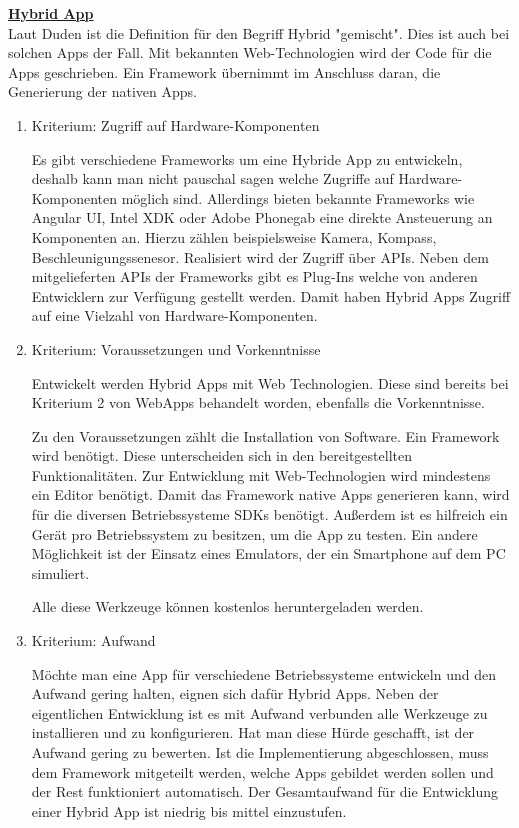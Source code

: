 \textbf{\underline{Hybrid App}}\\
Laut Duden ist die Definition für den Begriff Hybrid "gemischt". Dies ist auch bei solchen Apps der Fall. Mit bekannten Web-Technologien wird der Code für die Apps geschrieben. Ein Framework übernimmt im Anschluss daran, die Generierung der nativen Apps.  
\begin{enumerate}
\item Kriterium: Zugriff auf Hardware-Komponenten

Es gibt verschiedene Frameworks um eine Hybride App zu entwickeln, deshalb kann man nicht pauschal sagen welche Zugriffe auf Hardware-Komponenten möglich sind. Allerdings bieten bekannte Frameworks wie Angular UI, Intel XDK oder Adobe Phonegab eine direkte Ansteuerung an Komponenten an. Hierzu zählen beispielsweise Kamera, Kompass, Beschleunigungssenesor. Realisiert wird der Zugriff über APIs. Neben dem mitgelieferten APIs der Frameworks gibt es Plug-Ins welche von anderen Entwicklern zur Verfügung gestellt werden. Damit haben Hybrid Apps Zugriff auf eine Vielzahl von Hardware-Komponenten.

\item Kriterium: Voraussetzungen und Vorkenntnisse

Entwickelt werden Hybrid Apps mit Web Technologien. Diese sind bereits bei Kriterium 2 von WebApps behandelt worden, ebenfalls die Vorkenntnisse.

Zu den Voraussetzungen zählt die Installation von Software. Ein Framework wird benötigt. Diese unterscheiden sich in den bereitgestellten Funktionalitäten. Zur Entwicklung mit Web-Technologien wird mindestens ein Editor benötigt. Damit das Framework native Apps generieren kann, wird für die diversen Betriebssysteme SDKs benötigt. Außerdem ist es hilfreich ein Gerät pro Betriebssystem zu besitzen, um die App zu testen. Ein andere Möglichkeit ist der Einsatz eines Emulators, der ein Smartphone auf dem PC simuliert.

Alle diese Werkzeuge können kostenlos heruntergeladen werden.


\item Kriterium: Aufwand

Möchte man eine App für verschiedene Betriebssysteme entwickeln und den Aufwand gering halten, eignen sich dafür Hybrid Apps. Neben der eigentlichen Entwicklung ist es mit Aufwand verbunden alle Werkzeuge zu installieren und zu konfigurieren. Hat man diese Hürde geschafft, ist der Aufwand gering zu bewerten. Ist die Implementierung abgeschlossen, muss dem Framework mitgeteilt werden, welche Apps gebildet werden sollen und der Rest funktioniert automatisch. Der Gesamtaufwand für die Entwicklung einer Hybrid App ist niedrig bis mittel einzustufen.
\end{enumerate}

